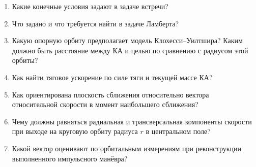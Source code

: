\documentclass[11pt,a4paper]{article}
\begin{document}
\begin{enumerate}
\item Какие конечные условия задают в задаче встречи?

\item Что задано и что требуется найти в задаче Ламберта?

\item Какую опорную орбиту предполагает модель Клохесси--Уилтшира? Каким должно
быть расстояние между КА и целью по сравнению с радиусом этой орбиты?

\item Как найти тяговое ускорение по силе тяги и текущей массе КА?

\item Как ориентирована плоскость сближения относительно вектора относительной
скорости в момент наибольшего сближения?

\item Чему должны равняться радиальная и трансверсальная компоненты скорости
при выходе на круговую орбиту радиуса $r$ в центральном поле?

\item Какой вектор оценивают по орбитальным измерениям при реконструкции
выполненного импульсного манёвра?
\end{enumerate}
\end{document}
